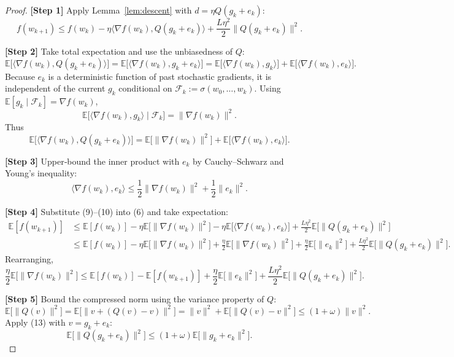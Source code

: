 \documentclass{article}
\newcommand{\EE}{\mathbb{E}}
\begin{document}
\begin{proof}
\textbf{[Step 1]} Apply Lemma~\ref{lem:descent} with $d=\eta Q(g_k+e_k)$:
\[
f(w_{k+1})\le f(w_k)-\eta\langle\nabla f(w_k),Q(g_k+e_k)\rangle
               +\frac{L\eta^{2}}{2}\|Q(g_k+e_k)\|^{2}. \tag{6}
\]

\textbf{[Step 2]} Take total expectation and use the unbiasedness of $Q$:
\[
\EE\!\big[\langle\nabla f(w_k),Q(g_k+e_k)\rangle\big]
 =\EE\!\big[\langle\nabla f(w_k),g_k+e_k\rangle\big]
 =\EE\!\big[\langle\nabla f(w_k),g_k\rangle\big]
   +\EE\!\big[\langle\nabla f(w_k),e_k\rangle\big]. \tag{7}
\]
Because $e_k$ is a deterministic function of past stochastic gradients, it is independent of the current $g_k$ conditional on $\mathcal{F}_k:=\sigma(w_0,\dots,w_k)$.  Using $\EE[g_k\mid\mathcal{F}_k]=\nabla f(w_k)$,
\[
\EE\!\big[\langle\nabla f(w_k),g_k\rangle\mid\mathcal{F}_k\big]
 =\|\nabla f(w_k)\|^{2}. \tag{8}
\]
Thus
\[
\EE\!\big[\langle\nabla f(w_k),Q(g_k+e_k)\rangle\big]
 =\EE\!\big[\|\nabla f(w_k)\|^{2}\big]
   +\EE\!\big[\langle\nabla f(w_k),e_k\rangle\big]. \tag{9}
\]

\textbf{[Step 3]} Upper‑bound the inner product with $e_k$ by Cauchy–Schwarz and Young’s inequality:
\[
\langle\nabla f(w_k),e_k\rangle
\le \frac{1}{2}\|\nabla f(w_k)\|^{2}+\frac{1}{2}\|e_k\|^{2}. \tag{10}
\]

\textbf{[Step 4]} Substitute (9)–(10) into (6) and take expectation:
\begin{align}
\EE[f(w_{k+1})]
&\le \EE[f(w_k)]-\eta\EE\!\big[\|\nabla f(w_k)\|^{2}\big]
      -\eta\EE\!\big[\langle\nabla f(w_k),e_k\rangle\big]
      +\frac{L\eta^{2}}{2}\EE\!\big[\|Q(g_k+e_k)\|^{2}\big] \nonumber\\
&\le \EE[f(w_k)]-\eta\EE\!\big[\|\nabla f(w_k)\|^{2}\big]
      +\frac{\eta}{2}\EE\!\big[\|\nabla f(w_k)\|^{2}\big]
      +\frac{\eta}{2}\EE\!\big[\|e_k\|^{2}\big]
      +\frac{L\eta^{2}}{2}\EE\!\big[\|Q(g_k+e_k)\|^{2}\big]. \tag{11}
\end{align}
Rearranging,
\[
\frac{\eta}{2}\EE\!\big[\|\nabla f(w_k)\|^{2}\big]
\le \EE[f(w_k)]-\EE[f(w_{k+1})]
     +\frac{\eta}{2}\EE\!\big[\|e_k\|^{2}\big]
     +\frac{L\eta^{2}}{2}\EE\!\big[\|Q(g_k+e_k)\|^{2}\big]. \tag{12}
\]

\textbf{[Step 5]} Bound the compressed norm using the variance property of $Q$:
\[
\EE\!\big[\|Q(v)\|^{2}\big]
 =\EE\!\big[\|v+(Q(v)-v)\|^{2}\big]
 =\|v\|^{2}+\EE\!\big[\|Q(v)-v\|^{2}\big]
 \le (1+\omega)\|v\|^{2}. \tag{13}
\]
Apply (13) with $v=g_k+e_k$:
\[
\EE\!\big[\|Q(g_k+e_k)\|^{2}\big]\le (1+\omega)\EE\!\big[\|g_k+e_k\|^{2}\big]. \tag{14}
\]


\end{proof}
\end{document}
